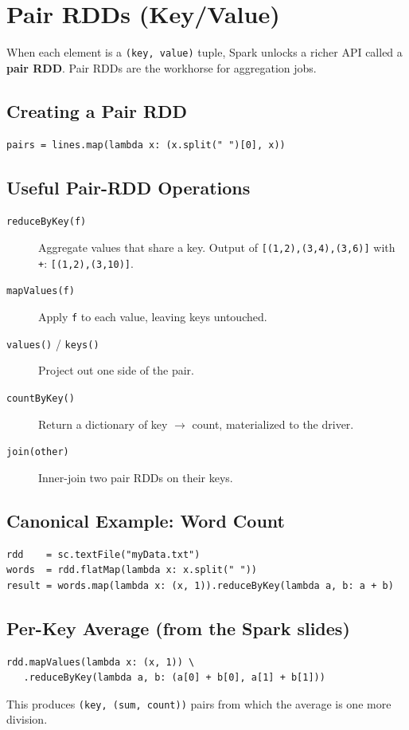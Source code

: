 \documentclass[11pt]{article}
\begin{document}
\section{Pair RDDs (Key/Value)}

When each element is a \texttt{(key, value)} tuple, Spark unlocks a richer API called a \textbf{pair RDD}. Pair RDDs are the workhorse for aggregation jobs.

\subsection{Creating a Pair RDD}
\begin{verbatim}
pairs = lines.map(lambda x: (x.split(" ")[0], x))
\end{verbatim}

\subsection{Useful Pair-RDD Operations}
\begin{description}
    \item[\texttt{reduceByKey(f)}] Aggregate values that share a key. Output of \texttt{[(1,2),(3,4),(3,6)]} with \texttt{+}: \texttt{[(1,2),(3,10)]}.
    \item[\texttt{mapValues(f)}] Apply \texttt{f} to each value, leaving keys untouched.
    \item[\texttt{values()} / \texttt{keys()}] Project out one side of the pair.
    \item[\texttt{countByKey()}] Return a dictionary of key $\to$ count, materialized to the driver.
    \item[\texttt{join(other)}] Inner-join two pair RDDs on their keys.
\end{description}

\subsection{Canonical Example: Word Count}
\begin{verbatim}
rdd    = sc.textFile("myData.txt")
words  = rdd.flatMap(lambda x: x.split(" "))
result = words.map(lambda x: (x, 1)).reduceByKey(lambda a, b: a + b)
\end{verbatim}

\subsection{Per-Key Average (from the Spark slides)}
\begin{verbatim}
rdd.mapValues(lambda x: (x, 1)) \
   .reduceByKey(lambda a, b: (a[0] + b[0], a[1] + b[1]))
\end{verbatim}
This produces \texttt{(key, (sum, count))} pairs from which the average is one more division.
\end{document}
